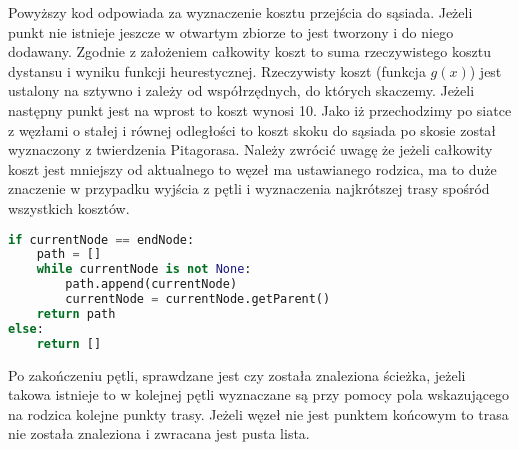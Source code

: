Powyższy kod odpowiada za wyznaczenie kosztu przejścia do sąsiada. Jeżeli punkt nie istnieje jeszcze w otwartym zbiorze 
to jest tworzony i do niego dodawany. Zgodnie z założeniem całkowity koszt to suma rzeczywistego kosztu dystansu i wyniku funkcji heurestycznej. 
Rzeczywisty koszt (funkcja $g(x)$) jest ustalony na sztywno i zależy od współrzędnych, do których skaczemy. 
Jeżeli następny punkt jest na wprost to koszt wynosi 10.
Jako iż przechodzimy po siatce z węzłami o stałej i równej odległości to koszt skoku do sąsiada po skosie został wyznaczony z twierdzenia Pitagorasa. 
Należy zwrócić uwagę że jeżeli całkowity koszt jest mniejszy od aktualnego to węzeł ma ustawianego rodzica, ma to duże znaczenie w przypadku wyjścia z pętli 
i wyznaczenia najkrótszej trasy spośród wszystkich kosztów. 

\begin{lstlisting}[language=Python,caption=Przygotowanie danych,label={kodPython3}]
if currentNode == endNode:
    path = []
    while currentNode is not None:
        path.append(currentNode)
        currentNode = currentNode.getParent()
    return path
else:
    return []
\end{lstlisting}

Po zakończeniu pętli, sprawdzane jest czy została znaleziona ścieżka, jeżeli takowa istnieje to w kolejnej pętli 
wyznaczane są przy pomocy pola wskazującego na rodzica kolejne punkty trasy. 
Jeżeli węzeł nie jest punktem końcowym to trasa nie została znaleziona i zwracana jest pusta lista.